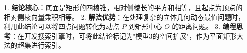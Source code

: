 \begin{summarybox}
1. \textbf{结论核心}：底面是矩形的四棱锥，相对侧棱长的平方和相等，且起点为顶点的相对侧棱向量乘积相等。
2. \textbf{解法优势}：在处理复杂的立体几何动态最值问题时，利用此结论可以将四点问题转化为动点 $P$ 到矩形中心 $O$ 的距离问题。
3. \textbf{编程思考}：在开发搜索引擎时，可将此结论标记为"模型3的空间扩展"，作为平面矩形大法的超集进行索引。
\end{summarybox}